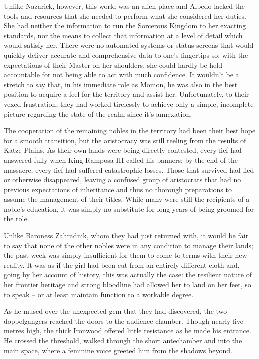 Unlike Nazarick, however, this world was an alien place and Albedo lacked the tools and resources that she needed to perform what she considered her duties. She had neither the information to run the Sorcerous Kingdom to her exacting standards, nor the means to collect that information at a level of detail which would satisfy her. There were no automated systems or status screens that would quickly deliver accurate and comprehensive data to one’s fingertips so, with the expectations of their Master on her shoulders, she could hardly be held accountable for not being able to act with much confidence. It wouldn’t be a stretch to say that, in his immediate role as Momon, he was also in the best position to acquire a feel for the territory and assist her. Unfortunately, to their vexed frustration, they had worked tirelessly to achieve only a simple, incomplete picture regarding the state of the realm since it’s annexation.

 

The cooperation of the remaining nobles in the territory had been their best hope for a smooth transition, but the aristocracy was still reeling from the results of Katze Plains. As their own lands were being directly contested, every fief had answered fully when King Ramposa III called his banners; by the end of the massacre, every fief had suffered catastrophic losses. Those that survived had fled or otherwise disappeared, leaving a confused group of aristocrats that had no previous expectations of inheritance and thus no thorough preparations to assume the management of their titles. While many were still the recipients of a noble’s education, it was simply no substitute for long years of being groomed for the role.

 

Unlike Baroness Zahradnik, whom they had just returned with, it would be fair to say that none of the other nobles were in any condition to manage their lands; the past week was simply insufficient for them to come to terms with their new reality. It was as if the girl had been cut from an entirely different cloth and, going by her account of history, this was actually the case: the resilient nature of her frontier heritage and strong bloodline had allowed her to land on her feet, so to speak – or at least maintain function to a workable degree.

 

As he mused over the unexpected gem that they had discovered, the two doppelgangers reached the doors to the audience chamber. Though nearly five metres high, the thick Ironwood offered little resistance as he made his entrance. He crossed the threshold, walked through the short antechamber and into the main space, where a feminine voice greeted him from the shadows beyond.

